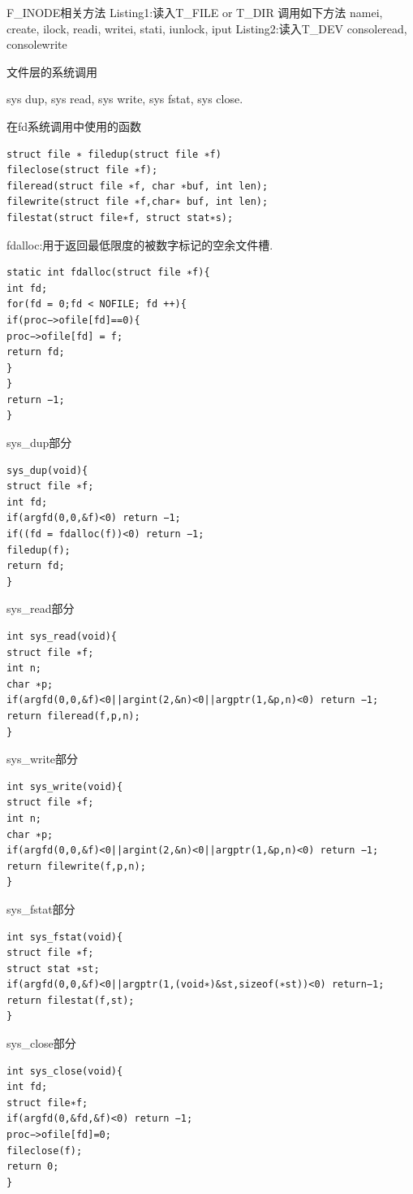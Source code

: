 F\_INODE相关方法
Listing1:读入T\_FILE or T\_DIR
调用如下方法
namei, create, ilock, readi, writei, stati, iunlock, iput
Listing2:读入T\_DEV
consoleread, consolewrite

文件层的系统调用

sys dup, sys read, sys write, sys fstat, sys close.

在fd系统调用中使用的函数

\begin{verbatim}
struct file ∗ filedup(struct file ∗f)
fileclose(struct file ∗f);
fileread(struct file ∗f, char ∗buf, int len);
filewrite(struct file ∗f,char∗ buf, int len);
filestat(struct file∗f, struct stat∗s);
\end{verbatim}

fdalloc:用于返回最低限度的被数字标记的空余文件槽.

\begin{verbatim}
static int fdalloc(struct file ∗f){
int fd;
for(fd = 0;fd < NOFILE; fd ++){
if(proc−>ofile[fd]==0){
proc−>ofile[fd] = f;
return fd;
}
}
return −1;
}
\end{verbatim}

sys\_dup部分

\begin{verbatim}
sys_dup(void){
struct file ∗f;
int fd;
if(argfd(0,0,&f)<0) return −1;
if((fd = fdalloc(f))<0) return −1;
filedup(f);
return fd;
}
\end{verbatim}

sys\_read部分

\begin{verbatim}
int sys_read(void){
struct file ∗f;
int n;
char ∗p;
if(argfd(0,0,&f)<0||argint(2,&n)<0||argptr(1,&p,n)<0) return −1;
return fileread(f,p,n);
}
\end{verbatim}
sys\_write部分
\begin{verbatim}
int sys_write(void){
struct file ∗f;
int n;
char ∗p;
if(argfd(0,0,&f)<0||argint(2,&n)<0||argptr(1,&p,n)<0) return −1;
return filewrite(f,p,n);
}
\end{verbatim}
sys\_fstat部分
\begin{verbatim}
int sys_fstat(void){
struct file ∗f;
struct stat ∗st;
if(argfd(0,0,&f)<0||argptr(1,(void∗)&st,sizeof(∗st))<0) return−1;
return filestat(f,st);
}
\end{verbatim}
sys\_close部分
\begin{verbatim}
int sys_close(void){
int fd;
struct file∗f;
if(argfd(0,&fd,&f)<0) return −1;
proc−>ofile[fd]=0;
fileclose(f);
return 0;
}
\end{verbatim}

